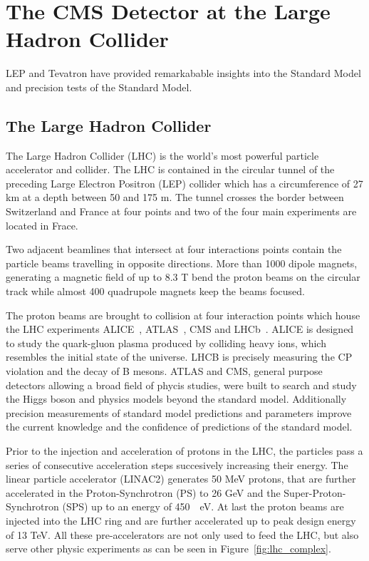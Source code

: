 
\chapter{The CMS Detector at the Large Hadron Collider}

LEP and Tevatron have provided remarkabable insights into the Standard Model and
precision tests of the Standard Model.

\section{The Large Hadron Collider}

The Large Hadron Collider (LHC) is the world's most powerful particle
accelerator and collider. The LHC is contained in the circular tunnel of the
preceding Large Electron Positron (LEP) collider which has a circumference of 27
km at a depth between 50 and 175 m. The tunnel crosses the border between
Switzerland and France at four points and two of the four main experiments are
located in Frace. 

Two adjacent beamlines that intersect at four interactions points contain the
particle beams travelling in opposite directions. More than 1000 dipole magnets,
generating a magnetic field of up to 8.3 T bend the proton beams on the circular track while
almost 400 quadrupole magnets keep the beams focused. 

The proton beams are brought to collision at four interaction points which house
the LHC experiments ALICE~\cite{ALICE}, ATLAS~\cite{ATLASa}, CMS and
LHCb~\cite{LHCb}. ALICE is designed to study the quark-gluon plasma produced by
colliding heavy ions, which resembles the initial state of the universe. LHCB is
precisely measuring the CP violation and the decay of B mesons. ATLAS and CMS,
general purpose detectors allowing a broad field of phycis studies, were built
to search and study the Higgs boson and physics models beyond the standard
model. Additionally precision measurements of standard model predictions and
parameters improve the current knowledge and the confidence of predictions of
the standard model.

Prior to the injection and acceleration of protons in the LHC, the particles
pass a series of consecutive acceleration steps succesively increasing their
energy. The linear particle accelerator (LINAC2) generates 50 MeV protons, that
are further accelerated in the Proton-Synchrotron (PS) to 26 GeV and
the Super-Proton-Synchrotron (SPS) up to an energy of \SI{450}{\giga
\electronvolt}. At last the proton beams are injected into the LHC ring and are
further accelerated up to peak design energy of 13 TeV. All these
pre-accelerators are not only used to feed the LHC, but also serve other physic
experiments as can be seen in Figure~\ref{fig:lhc_complex}.

